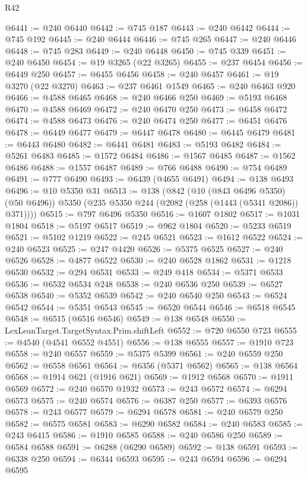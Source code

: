 \begin{lexlean}{R42}
\begin{coremodule}
{@6441 := @240 @6440
@6442 := @745 @187
@6443 := @240 @6442
@6444 := @745 @192
@6445 := @240 @6444
@6446 := @745 @265
@6447 := @240 @6446
@6448 := @745 @283
@6449 := @240 @6448
@6450 := @745 @339
@6451 := @240 @6450
@6454 := @19 @3265 (@22 @3265)
@6455 := @237 @6454
@6456 := @6449 @250
@6457 := @6455 @6456
@6458 := @240 @6457
@6461 := @19 @3270 (@22 @3270)
@6463 := @237 @6461 @1549
@6465 := @240 @6463 @920
@6466 := @4588 @6465
@6468 := @240 @6466 @250
@6469 := @5193 @6468
@6470 := @4588 @6469
@6472 := @240 @6470 @250
@6473 := @6458 @6472
@6474 := @4588 @6473
@6476 := @240 @6474 @250
@6477 := @6451 @6476
@6478 := @6449 @6477
@6479 := @6447 @6478
@6480 := @6445 @6479
@6481 := @6443 @6480
@6482 := @6441 @6481
@6483 := @5193 @6482
@6484 := @5261 @6483
@6485 := @1572 @6484
@6486 := @1567 @6485
@6487 := @1562 @6486
@6488 := @1557 @6487
@6489 := @766 @6488
@6490 := @754 @6489
@6491 := @777 @6490
@6493 := @6439 (@4655 @6491)
@6494 := @138 @6493
@6496 := @10 @5350 @31
@6513 := @138
    (@842
      (@10 (@843 @6496 @5350) (@50 @6496))
      @5350
      (@235 @5350 @244 (@2082 (@258 (@1443 (@5341 @2086)) @371))))
@6515 := @797 @6496 @5350
@6516 := @1607 @1802
@6517 := @1031 @1804
@6518 := @5197 @6517
@6519 := @962 @1804
@6520 := @5233 @6519
@6521 := @5102 @1219
@6522 := @245 @6521
@6523 := @1612 @6522
@6524 := @240 @6523
@6525 := @247 @4420
@6526 := @5375 @6525
@6527 := @240 @6526
@6528 := @4877 @6522
@6530 := @240 @6528 @1862
@6531 := @1218 @6530
@6532 := @294 @6531
@6533 := @249 @418
@6534 := @5371 @6533
@6536 := @6532 @6534 @248
@6538 := @240 @6536 @250
@6539 := @6527 @6538
@6540 := @5352 @6539
@6542 := @240 @6540 @250
@6543 := @6524 @6542
@6544 := @5351 @6543
@6545 := @6520 @6544
@6546 := @6518 @6545
@6548 := @6515 (@6516 @6546)
@6549 := @138 @6548
@6550 := LexLeanTarget.TargetSyntax.Prim.shiftLeft
@6552 := @720 @6550 @723
@6555 := @4540 (@4541 @6552 @4551)
@6556 := @138 @6555
@6557 := @1910 @723
@6558 := @240 @6557
@6559 := @5375 @5399
@6561 := @240 @6559 @250
@6562 := @6558 @6561
@6564 := @6356 (@5371 @6562)
@6565 := @138 @6564
@6568 := @1914 @621 (@1916 @621)
@6569 := @1912 @6568
@6570 := @1911 @6569
@6572 := @240 @6570 @1932
@6573 := @243 @6572
@6574 := @6294 @6573
@6575 := @240 @6574
@6576 := @6387 @250
@6577 := @6393 @6576
@6578 := @243 @6577
@6579 := @6294 @6578
@6581 := @240 @6579 @250
@6582 := @6575 @6581
@6583 := @6290 @6582
@6584 := @240 @6583
@6585 := @243 @6415
@6586 := @1910 @6585
@6588 := @240 @6586 @250
@6589 := @6584 @6588
@6591 := @6288 (@6290 @6589)
@6592 := @138 @6591
@6593 := @6338 @250
@6594 := @6344 @6593
@6595 := @243 @6594
@6596 := @6294 @6595
}
\end{coremodule}
\end{lexlean}
